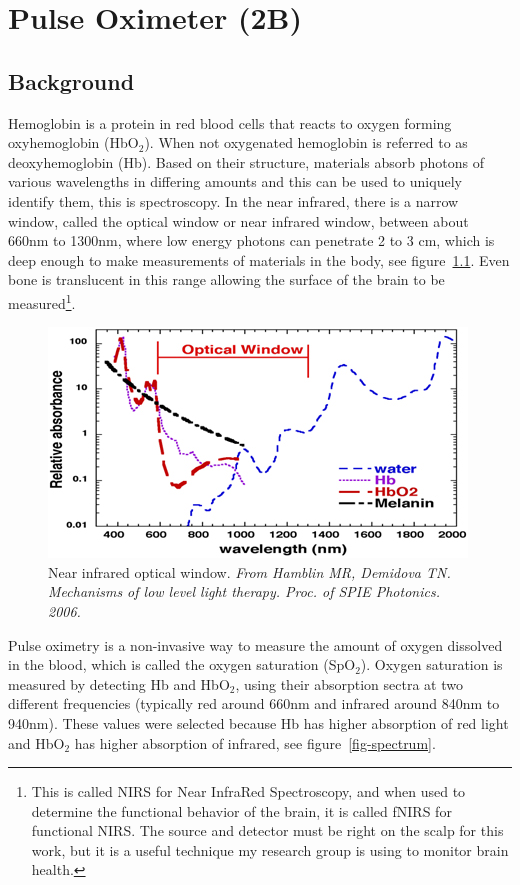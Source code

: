 \chapter{Pulse Oximeter (2B)}

\section{Background}
Hemoglobin is a protein in red blood cells that reacts to oxygen forming oxyhemoglobin (HbO$_2$).  When not oxygenated hemoglobin is referred to as deoxyhemoglobin (Hb).  Based on their structure, materials absorb photons of various wavelengths in differing amounts and this can be used to uniquely identify them, this is spectroscopy.  In the near infrared, there is a narrow window, called the optical window or near infrared window, between about 660nm to 1300nm, where low energy photons can penetrate 2 to 3 cm, which is deep enough to make measurements of materials in the body, see figure~\ref{fig-optical-window}.  Even bone is translucent in this range allowing the surface of the brain to be measured\footnote{This is called NIRS for Near InfraRed Spectroscopy, and when used to determine the functional behavior of the brain, it is called fNIRS for functional NIRS.  The source and detector must be right on the scalp for this work, but it is a useful technique my research group is using to monitor brain health.}.

 \begin{figure}
 \caption{Near infrared optical window.  \emph{From Hamblin MR, Demidova TN. Mechanisms of low level light therapy. Proc. of SPIE Photonics. 2006.}}
 \label{fig-optical-window}
 \includegraphics{../images/1669_fig1.jpg}
 \end{figure}

Pulse oximetry is a non-invasive way to measure the amount of oxygen dissolved in the blood, which is called the oxygen saturation (SpO$_2$). Oxygen saturation is measured by detecting Hb and HbO$_2$, using their absorption sectra at two different frequencies (typically red around 660nm and infrared around 840nm to 940nm).  These values were selected because Hb has higher absorption of red light and HbO$_2$ has higher absorption of infrared, see figure~\ref{fig-spectrum}.

